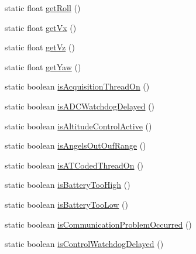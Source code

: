\begin{DoxyCompactItemize}
\item 
static float \hyperlink{classworkspace_1_1_a_r_drone_nav_data_1_1src_1_1controller_1_1_drone_test_a18f1549f343002097b39042895a592ff}{get\+Roll} ()
\item 
static float \hyperlink{classworkspace_1_1_a_r_drone_nav_data_1_1src_1_1controller_1_1_drone_test_a5051c71003fdb7f50737df23326e56de}{get\+Vx} ()
\item 
static float \hyperlink{classworkspace_1_1_a_r_drone_nav_data_1_1src_1_1controller_1_1_drone_test_a676e46520a5f4cf6962f2124644e76e9}{get\+Vz} ()
\item 
static float \hyperlink{classworkspace_1_1_a_r_drone_nav_data_1_1src_1_1controller_1_1_drone_test_a7d1e393f0bce147da1c2b1557d4d0cae}{get\+Yaw} ()
\item 
static boolean \hyperlink{classworkspace_1_1_a_r_drone_nav_data_1_1src_1_1controller_1_1_drone_test_af6edb59331089cc716c0f354766af494}{is\+Acquisition\+Thread\+On} ()
\item 
static boolean \hyperlink{classworkspace_1_1_a_r_drone_nav_data_1_1src_1_1controller_1_1_drone_test_afde3ed049d2973937df508874b1eaaca}{is\+A\+D\+C\+Watchdog\+Delayed} ()
\item 
static boolean \hyperlink{classworkspace_1_1_a_r_drone_nav_data_1_1src_1_1controller_1_1_drone_test_a64d383fccd430ae765bcfe9efec243e4}{is\+Altitude\+Control\+Active} ()
\item 
static boolean \hyperlink{classworkspace_1_1_a_r_drone_nav_data_1_1src_1_1controller_1_1_drone_test_a18bb4c48c961752217a614a5bfbbd04b}{is\+Angels\+Out\+Ouf\+Range} ()
\item 
static boolean \hyperlink{classworkspace_1_1_a_r_drone_nav_data_1_1src_1_1controller_1_1_drone_test_a6f76333e15b9d230c57b7fa766b943fe}{is\+A\+T\+Coded\+Thread\+On} ()
\item 
static boolean \hyperlink{classworkspace_1_1_a_r_drone_nav_data_1_1src_1_1controller_1_1_drone_test_ae314e76854c0bd7502400582bc1df70d}{is\+Battery\+Too\+High} ()
\item 
static boolean \hyperlink{classworkspace_1_1_a_r_drone_nav_data_1_1src_1_1controller_1_1_drone_test_ac7bbe87a46f7c1209edeff173e1c2e3e}{is\+Battery\+Too\+Low} ()
\item 
static boolean \hyperlink{classworkspace_1_1_a_r_drone_nav_data_1_1src_1_1controller_1_1_drone_test_a7fc58f31faee4b9da6fac8bc8956cd1c}{is\+Communication\+Problem\+Occurred} ()
\item 
static boolean \hyperlink{classworkspace_1_1_a_r_drone_nav_data_1_1src_1_1controller_1_1_drone_test_a5413d78de10a952079448a2b50c8b69f}{is\+Control\+Watchdog\+Delayed} ()

\end{DoxyCompactItemize}
